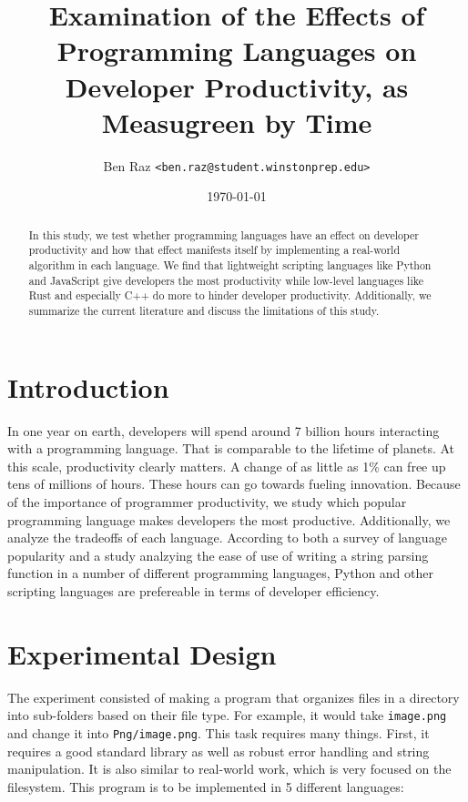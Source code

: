 \documentclass{article}
\title{
    Examination of the Effects of Programming Languages on Developer Productivity, as Measugreen by Time
}
\author{Ben Raz \texttt{<ben.raz@student.winstonprep.edu>}}
\date{\today}
\begin{document}
\maketitle

\begin{abstract}
    In this study, we test whether programming languages have an effect on developer productivity and how that effect manifests itself by implementing a real-world algorithm in each language. We find that lightweight scripting languages like Python and JavaScript give developers the most productivity while low-level languages like Rust and especially C++ do more to hinder developer productivity. Additionally, we summarize the current literature and discuss the limitations of this study.
\end{abstract}

\section{Introduction}

In one year on earth, developers will spend around 7 billion hours\cite{softwareCodeTime} interacting with a programming language. That is comparable to the lifetime of planets. At this scale, productivity clearly matters. A change of as little as 1\% can free up tens of millions of hours. These hours can go towards fueling innovation. Because of the importance of programmer productivity, we study which popular programming language makes developers the most productive. Additionally, we analyze the tradeoffs of each language. According to both a survey of language popularity\cite{tiobe} and a study analzying the ease of use of writing a string parsing function in a number of different programming languages\cite{prechelt2000}, Python and other scripting languages are prefereable in terms of developer efficiency.

\section{Experimental Design}

The experiment consisted of making a program that organizes files in a directory into sub-folders based on their file type. For example, it would take \texttt{image.png} and change it into \texttt{Png/image.png}. This task requires many things. First, it requires a good standard library as well as robust error handling and string manipulation. It is also similar to real-world work, which is very focused on the filesystem. This program is to be implemented in 5 different languages:
\end{document}
